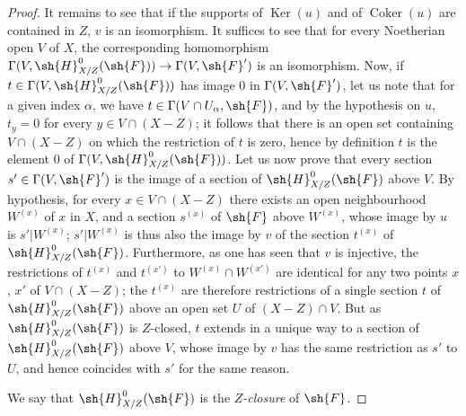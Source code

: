 \begin{proof}
It remains to see that if the supports of $\operatorname{Ker}(u)$ and of $\operatorname{Coker}(u)$ are contained in $Z$, $v$ is an isomorphism.
It suffices to see that for every Noetherian open $V$ of $X$, the corresponding homomorphism $\Gamma(V,\sh{H}^0_{X/Z}(\sh{F}))\to\Gamma(V,\sh{F}')$ is an isomorphism.
Now, if $t\in\Gamma(V,\sh{H}^0_{X/Z}(\sh{F}))$ has image $0$ in $\Gamma(V,\sh{F}')$, let us note that for a given index $\alpha$, we have $t\in\Gamma(V\cap U_\alpha,\sh{F})$, and by the hypothesis on $u$, $t_y=0$ for every $y\in V\cap(X-Z)$; it follows that there is an open set containing $V\cap(X-Z)$ on which the restriction of $t$ is zero, hence by definition $t$ is the element $0$ of $\Gamma(V,\sh{H}^0_{X/Z}(\sh{F}))$.
Let us now prove that every section $s'\in\Gamma(V,\sh{F}')$ is the image of a section of $\sh{H}^0_{X/Z}(\sh{F})$ above $V$.
By hypothesis, for every $x\in V\cap(X-Z)$ there exists an open neighbourhood $W^{(x)}$ of $x$ in $X$, and a section $s^{(x)}$ of $\sh{F}$ above $W^{(x)}$, whose image by $u$ is $s'|W^{(x)}$; $s'|W^{(x)}$ is thus also the image by $v$ of the section $t^{(x)}$ of $\sh{H}^0_{X/Z}(\sh{F})$.
Furthermore, as one has seen that $v$ is injective, the restrictions of $t^{(x)}$ and $t^{(x')}$ to $W^{(x)}\cap W^{(x')}$ are identical for any two points $x$, $x'$ of $V\cap(X-Z)$; the $t^{(x)}$ are therefore restrictions of a single section $t$ of $\sh{H}^0_{X/Z}(\sh{F})$ above an open set $U$ of $(X-Z)\cap V$.
But as $\sh{H}^0_{X/Z}(\sh{F})$ is $Z$-closed, $t$ extends in a unique way to a section of $\sh{H}^0_{X/Z}(\sh{F})$ above $V$, whose image by $v$ has the same restriction as $s'$ to $U$, and hence coincides with $s'$ for the same reason.

We say that $\sh{H}^0_{X/Z}(\sh{F})$ is the \emph{$Z$-closure} of $\sh{F}$.
\end{proof}



